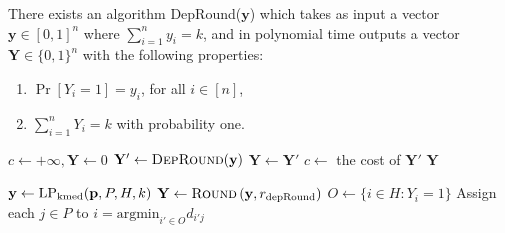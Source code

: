 \begin{proposition}
\label{prop:dep-round}
There exists an algorithm {\sc DepRound}($\mathbf{y}$) which takes as input a vector $\mathbf{y} \in [0,1]^n$ where $\sum_{i=1}^n y_i = k$, and in polynomial time outputs a vector $\mathbf{Y} \in \{0,1\}^n$  with the following properties:
\begin{enumerate}
\item $\Pr[Y_i = 1] = y_i$, for all $i \in [n]$,
\item $\sum_{i=1}^n Y_i = k$ with probability one.
\end{enumerate}
\end{proposition} 


\begin{algorithm}[h]
\caption{$\textsc{Round}\left( \mathbf{y}, r \right)$}
\begin{algorithmic}[1]
\STATE {}
\STATE $c \gets +\infty, \mathbf{Y} \gets 0$
	\STATE $\mathbf{Y}' \gets \textsc{DepRound}(\mathbf{y})$
		\STATE $\mathbf{Y} \gets \mathbf{Y}'$
		\STATE $c \gets $ the cost of $\mathbf{Y}'$
	\ENDIF
\ENDFOR
\RETURN $\mathbf{Y}$
\end{algorithmic} 
\end{algorithm}

\begin{algorithm}[h]
\caption{$\algokmedstatic \left(H, P, \mathbf{p}, w, \ell, r_{\text{depRound}} \right)$}
\label{algo:kmedstatic}
\begin{algorithmic}[1]
\STATE {}
\STATE $\mathbf{y} \gets \text{LP}_{\text{kmed}}(\mathbf{p}, P, H, k)$
\STATE $\mathbf{Y} \gets \textsc{Round}\left( \mathbf{y}, r_{\text{depRound}} \right)$
\STATE $O \gets \{i \in H: Y_i = 1\}$
\STATE Assign each $j\in P$ to $i=\mbox{argmin}_{i'\in O} d_{i'j}$
\end{algorithmic} 
\end{algorithm}

